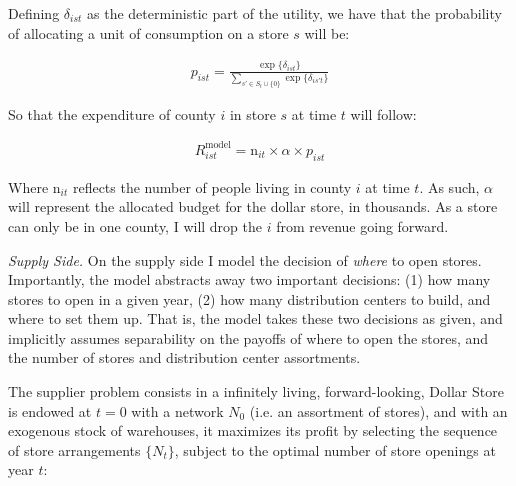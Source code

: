 \documentclass[11.5pt]{article}
\begin{document}


Defining $\delta_{ist}$ as the deterministic part of the utility, we  have that the probability of allocating a unit of consumption on a store $s$ will be:

\begin{align}
    p_{ist} = \frac{\exp\{\delta_{ist}\}}{\sum_{s' \in S_t \cup \{0\}}\exp\{\delta_{is't}\} }
\end{align}

So that the expenditure of county $i$ in store $s$ at time $t$ will follow:

\begin{align}
     R_{ist}^\text{model}= \text{n}_{it} \times  \alpha \times  p_{ist} 
\end{align}

Where $\text{n}_{it}$ reflects the number of people living in county $i$ at time $t$. As such, $\alpha$ will represent the allocated budget for the dollar store, in thousands. As a store can only be in one county, I will drop the $i$ from revenue going forward. 





\textit{Supply Side.} On the supply side I model the decision of \textit{where} to open stores. Importantly, the model abstracts away two important decisions: (1) how many stores to open in a given year, (2) how many distribution centers to build, and where to set them up. That is, the model takes these two decisions as given, and implicitly assumes separability on the payoffs of where to open the stores, and the number of stores and distribution center assortments. 


The supplier problem consists in a infinitely living, forward-looking, {Dollar Store} is endowed at $t=0$ with a network $N_0$ (i.e. an assortment of stores), and with an exogenous stock of warehouses, it maximizes its profit by selecting the sequence of store arrangements $\{N_t\}$, subject to the optimal number of store openings at year $t$:
\end{document}
